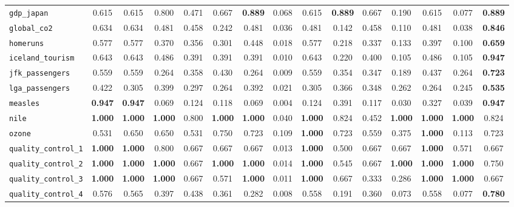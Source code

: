 \begin{tabular}{lcccccccccccccc}
\verb+gdp_japan+ & 0.615 & 0.615 & 0.800 & 0.471 & 0.667 & \textbf{0.889} & 0.068 & 0.615 & \textbf{0.889} & 0.667 & 0.190 & 0.615 & 0.077 & \textbf{0.889}\\
\verb+global_co2+ & 0.634 & 0.634 & 0.481 & 0.458 & 0.242 & 0.481 & 0.036 & 0.481 & 0.142 & 0.458 & 0.110 & 0.481 & 0.038 & \textbf{0.846}\\
\verb+homeruns+ & 0.577 & 0.577 & 0.370 & 0.356 & 0.301 & 0.448 & 0.018 & 0.577 & 0.218 & 0.337 & 0.133 & 0.397 & 0.100 & \textbf{0.659}\\
\verb+iceland_tourism+ & 0.643 & 0.643 & 0.486 & 0.391 & 0.391 & 0.391 & 0.010 & 0.643 & 0.220 & 0.400 & 0.105 & 0.486 & 0.105 & \textbf{0.947}\\
\verb+jfk_passengers+ & 0.559 & 0.559 & 0.264 & 0.358 & 0.430 & 0.264 & 0.009 & 0.559 & 0.354 & 0.347 & 0.189 & 0.437 & 0.264 & \textbf{0.723}\\
\verb+lga_passengers+ & 0.422 & 0.305 & 0.399 & 0.297 & 0.264 & 0.392 & 0.021 & 0.305 & 0.366 & 0.348 & 0.262 & 0.264 & 0.245 & \textbf{0.535}\\
\verb+measles+ & \textbf{0.947} & \textbf{0.947} & 0.069 & 0.124 & 0.118 & 0.069 & 0.004 & 0.124 & 0.391 & 0.117 & 0.030 & 0.327 & 0.039 & \textbf{0.947}\\
\verb+nile+ & \textbf{1.000} & \textbf{1.000} & \textbf{1.000} & 0.800 & \textbf{1.000} & \textbf{1.000} & 0.040 & \textbf{1.000} & 0.824 & 0.452 & \textbf{1.000} & \textbf{1.000} & \textbf{1.000} & 0.824\\
\verb+ozone+ & 0.531 & 0.650 & 0.650 & 0.531 & 0.750 & 0.723 & 0.109 & \textbf{1.000} & 0.723 & 0.559 & 0.375 & \textbf{1.000} & 0.113 & 0.723\\
\verb+quality_control_1+ & \textbf{1.000} & \textbf{1.000} & 0.800 & 0.667 & 0.667 & 0.667 & 0.013 & \textbf{1.000} & 0.500 & 0.667 & 0.667 & \textbf{1.000} & 0.571 & 0.667\\
\verb+quality_control_2+ & \textbf{1.000} & \textbf{1.000} & \textbf{1.000} & 0.667 & \textbf{1.000} & \textbf{1.000} & 0.014 & \textbf{1.000} & 0.545 & 0.667 & \textbf{1.000} & \textbf{1.000} & \textbf{1.000} & 0.750\\
\verb+quality_control_3+ & \textbf{1.000} & \textbf{1.000} & \textbf{1.000} & 0.667 & 0.571 & \textbf{1.000} & 0.011 & \textbf{1.000} & 0.667 & 0.333 & 0.286 & \textbf{1.000} & \textbf{1.000} & 0.667\\
\verb+quality_control_4+ & 0.576 & 0.565 & 0.397 & 0.438 & 0.361 & 0.282 & 0.008 & 0.558 & 0.191 & 0.360 & 0.073 & 0.558 & 0.077 & \textbf{0.780}\\

\end{tabular}
